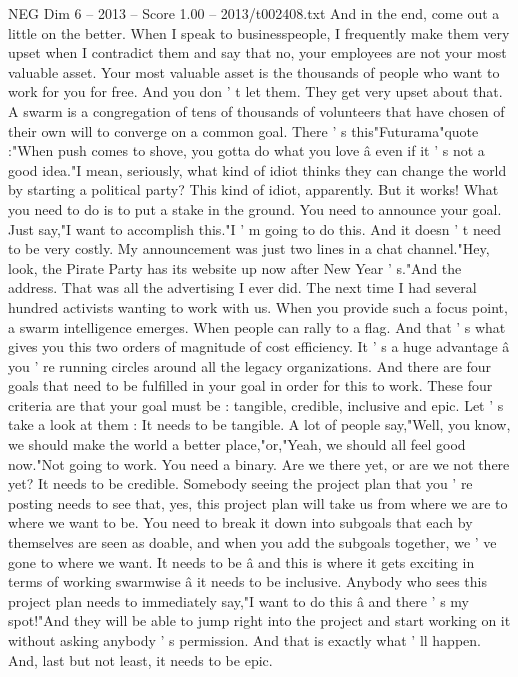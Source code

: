 \begin{textsample}{NEG Dim 6 – 2013 – Score 1.00 – 2013/t002408.txt}
And in the end, come out a little on the better.
When I speak to businesspeople, I frequently make them very upset when I contradict them and say that no, your employees are not your most valuable asset.
Your most valuable asset is the thousands of people who want to work for you for free.
And you don ' t let them.
They get very upset about that.
A swarm is a congregation of tens of thousands of volunteers that have chosen of their own will to converge on a common goal.
There ' s this"Futurama"quote :"When push comes to shove, you gotta do what you love â even if it ' s not a good idea."I mean, seriously, what kind of idiot thinks they can change the world by starting a political party?
This kind of idiot, apparently.
But it works!
What you need to do is to put a stake in the ground.
You need to announce your goal.
Just say,"I want to accomplish this."I ' m going to do this.
And it doesn ' t need to be very costly.
My announcement was just two lines in a chat channel."Hey, look, the Pirate Party has its website up now after New Year ' s."And the address.
That was all the advertising I ever did.
The next time I had several hundred activists wanting to work with us.
When you provide such a focus point, a swarm intelligence emerges.
When people can rally to a flag.
And that ' s what gives you this two orders of magnitude of cost efficiency.
It ' s a huge advantage â you ' re running circles around all the legacy organizations.
And there are four goals that need to be fulfilled in your goal in order for this to work.
These four criteria are that your goal must be : tangible, credible, inclusive and epic.
Let ' s take a look at them : It needs to be tangible.
A lot of people say,"Well, you know, we should make the world a better place,"or,"Yeah, we should all feel good now."Not going to work.
You need a binary.
Are we there yet, or are we not there yet?
It needs to be credible.
Somebody seeing the project plan that you ' re posting needs to see that, yes, this project plan will take us from where we are to where we want to be.
You need to break it down into subgoals that each by themselves are seen as doable, and when you add the subgoals together, we ' ve gone to where we want.
It needs to be â and this is where it gets exciting in terms of working swarmwise â it needs to be inclusive.
Anybody who sees this project plan needs to immediately say,"I want to do this â and there ' s my spot!"And they will be able to jump right into the project and start working on it without asking anybody ' s permission.
And that is exactly what ' ll happen.
And, last but not least, it needs to be epic.

\end{textsample}
